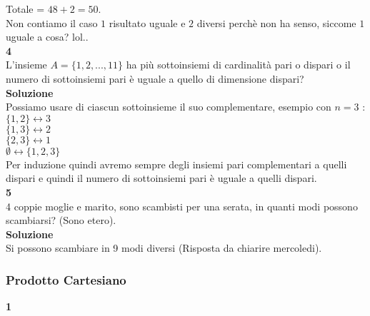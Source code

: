 \documentclass[11pt]{article}
\begin{document}
            Totale = $48 + 2 = 50$.\\
            Non contiamo il caso $1$ risultato uguale e $2$ diversi perchè non ha senso, siccome $1$ uguale a cosa? lol..\\
            \textbf{\large 4}\\
            L'insieme $A = \{1,2,...,11\}$ ha più sottoinsiemi di cardinalità pari o dispari o il numero di sottoinsiemi pari è uguale a quello di dimensione dispari?\\
            \textbf{\large Soluzione}\\
            Possiamo usare di ciascun sottoinsieme il suo complementare, esempio con $n = 3$ : \\
            $\{1,2\} \longleftrightarrow 3$\\
            $\{1,3\} \longleftrightarrow 2$\\
            $\{2,3\} \longleftrightarrow 1$\\
            $\emptyset \longleftrightarrow \{1,2,3\}$\\
            Per induzione quindi avremo sempre degli insiemi pari complementari a quelli dispari e quindi il numero di sottoinsiemi pari è uguale a quelli dispari.\\
            \textbf{\large 5}\\
            4 coppie moglie e marito, sono scambisti per una serata, in quanti modi possono scambiarsi? (Sono etero).\\
            \textbf{\large Soluzione}\\
            Si possono scambiare in 9 modi diversi (Risposta da chiarire mercoledi).
            \\
            \subsubsection{Prodotto Cartesiano}
            \textbf{1}\\
            
                
\end{document}
